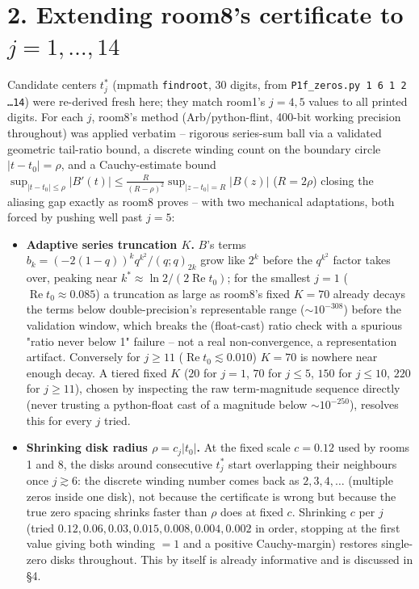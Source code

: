 \documentclass[11pt]{article}
\begin{document}
\section*{2. Extending room8's certificate to $j=1,\ldots,14$}
Candidate centers $t^*_j$ (mpmath \texttt{findroot}, 30 digits, from
\texttt{P1f\_zeros.py 1 6 1 2 \ldots 14}) were re-derived fresh here; they match room1's $j=4,5$
values to all printed digits. For each $j$, room8's method (Arb/python-flint, 400-bit working
precision throughout) was applied verbatim -- rigorous series-sum ball via a validated geometric
tail-ratio bound, a discrete winding count on the boundary circle $|t-t_0|=\rho$, and a
Cauchy-estimate bound $\sup_{|t-t_0|\le\rho}|B'(t)|\le\frac{R}{(R-\rho)^2}\sup_{|z-t_0|=R}|B(z)|$
($R=2\rho$) closing the aliasing gap exactly as room8 proves -- with two mechanical adaptations,
both forced by pushing well past $j=5$:
\begin{itemize}
\item \textbf{Adaptive series truncation $K$.} $B$'s terms $b_k=(-2(1-q))^kq^{k^2}/(q;q)_{2k}$ grow
like $2^k$ before the $q^{k^2}$ factor takes over, peaking near $k^*\approx\ln2/(2\operatorname{Re}t_0)$;
for the smallest $j=1$ ($\operatorname{Re}t_0\approx0.085$) a truncation as large as room8's fixed
$K=70$ already decays the terms below double-precision's representable range ($\sim10^{-308}$)
before the validation window, which breaks the (float-cast) ratio check with a spurious "ratio never
below 1" failure -- not a real non-convergence, a representation artifact. Conversely for $j\ge11$
($\operatorname{Re}t_0\lesssim0.010$) $K=70$ is nowhere near enough decay. A tiered fixed $K$
($20$ for $j=1$, $70$ for $j\le5$, $150$ for $j\le10$, $220$ for $j\ge11$), chosen by inspecting the
raw term-magnitude sequence directly (never trusting a python-float cast of a magnitude below
$\sim10^{-250}$), resolves this for every $j$ tried.
\item \textbf{Shrinking disk radius $\rho=c_j|t_0|$.} At the fixed scale $c=0.12$ used by rooms 1
and 8, the disks around consecutive $t^*_j$ start overlapping their neighbours once $j\gtrsim6$: the
discrete winding number comes back as $2,3,4,\ldots$ (multiple zeros inside one disk), not because
the certificate is wrong but because the true zero spacing shrinks faster than $\rho$ does at fixed
$c$. Shrinking $c$ per $j$ (tried $0.12,0.06,0.03,0.015,0.008,0.004,0.002$ in order, stopping at the
first value giving both winding $=1$ and a positive Cauchy-margin) restores single-zero disks
throughout. This by itself is already informative and is discussed in \S4.
\end{itemize}
\end{document}
